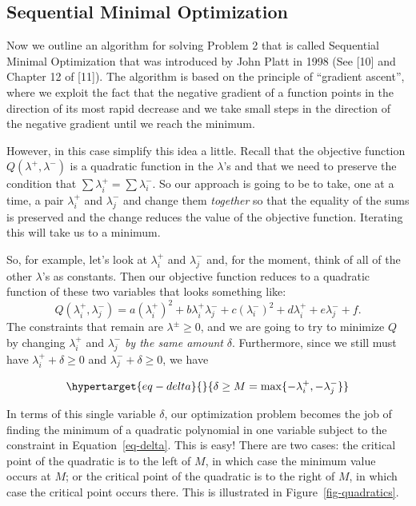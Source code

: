 \documentclass[
  11pt,
  letterpaper,
]{scrbook}
\theoremstyle{plain}
\theoremstyle{plain}
\theoremstyle{remark}
\begin{document}
\hypertarget{sequential-minimal-optimization}{%
\subsection{Sequential Minimal
Optimization}\label{sequential-minimal-optimization}}

Now we outline an algorithm for solving Problem 2 that is called
Sequential Minimal Optimization that was introduced by John Platt in
1998 (See {[}10{]} and Chapter 12 of {[}11{]}). The algorithm is based
on the principle of ``gradient ascent'', where we exploit the fact that
the negative gradient of a function points in the direction of its most
rapid decrease and we take small steps in the direction of the negative
gradient until we reach the minimum.

However, in this case simplify this idea a little. Recall that the
objective function \(Q(\lambda^{+},\lambda^{-})\) is a quadratic
function in the \(\lambda\)'s and that we need to preserve the condition
that \(\sum \lambda^{+}_{i}=\sum\lambda^{-}_{i}\). So our approach is
going to be to take, one at a time, a pair \(\lambda^{+}_{i}\) and
\(\lambda^{-}_{j}\) and change them \emph{together} so that the equality
of the sums is preserved and the change reduces the value of the
objective function. Iterating this will take us to a minimum.

So, for example, let's look at \(\lambda^{+}_i\) and \(\lambda^{-}_{j}\)
and, for the moment, think of all of the other \(\lambda\)'s as
constants. Then our objective function reduces to a quadratic function
of these two variables that looks something like: \[
Q(\lambda_{i}^{+},\lambda_{j}^{-}) = a(\lambda^{+}_i)^2+b\lambda^{+}_i\lambda^{-}_j+c(\lambda^{-}_{i})^2+d\lambda^{+}_i+e\lambda^{-}_{j}+f.
\] The constraints that remain are \(\lambda^{\pm}\ge 0\), and we are
going to try to minimize \(Q\) by changing \(\lambda_{i}^{+}\) and
\(\lambda_{j}^{-}\) \emph{by the same amount} \(\delta\). Furthermore,
since we still must have \(\lambda_{i}^{+}+\delta\ge 0\) and
\(\lambda_{j}^{-}+\delta\ge 0\), we have

\begin{equation}\protect\hypertarget{eq-delta}{}{
\delta\ge M=\max\{-\lambda_{i}^{+},-\lambda_{j}^{-}\}
}\label{eq-delta}\end{equation}

In terms of this single variable \(\delta\), our optimization problem
becomes the job of finding the minimum of a quadratic polynomial in one
variable subject to the constraint in Equation~\ref{eq-delta}. This is
easy! There are two cases: the critical point of the quadratic is to the
left of \(M\), in which case the minimum value occurs at \(M\); or the
critical point of the quadratic is to the right of \(M\), in which case
the critical point occurs there. This is illustrated in
Figure~\ref{fig-quadratics}.
\end{document}
